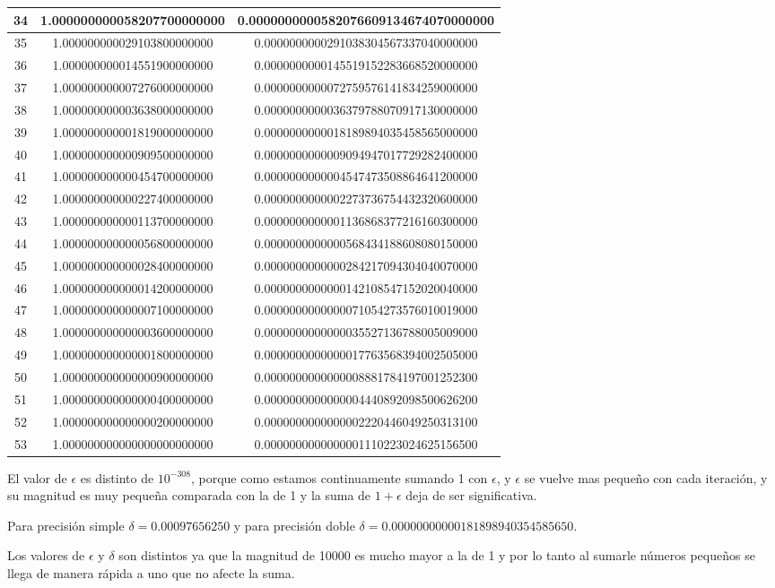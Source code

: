 \documentclass{article}
\begin{document}
\begin{itemize}
\begin{longtable}{|c||c|c|}
		34 & 1.000000000058207700000000 & 0.0000000000582076609134674070000000 \\ \hline 
		35 & 1.000000000029103800000000 & 0.0000000000291038304567337040000000 \\ \hline 
		36 & 1.000000000014551900000000 & 0.0000000000145519152283668520000000 \\ \hline 
		37 & 1.000000000007276000000000 & 0.0000000000072759576141834259000000 \\ \hline 
		38 & 1.000000000003638000000000 & 0.0000000000036379788070917130000000 \\ \hline 
		39 & 1.000000000001819000000000 & 0.0000000000018189894035458565000000 \\ \hline 
		40 & 1.000000000000909500000000 & 0.0000000000009094947017729282400000 \\ \hline 
		41 & 1.000000000000454700000000 & 0.0000000000004547473508864641200000 \\ \hline 
		42 & 1.000000000000227400000000 & 0.0000000000002273736754432320600000 \\ \hline 
		43 & 1.000000000000113700000000 & 0.0000000000001136868377216160300000 \\ \hline 
		44 & 1.000000000000056800000000 & 0.0000000000000568434188608080150000 \\ \hline 
		45 & 1.000000000000028400000000 & 0.0000000000000284217094304040070000 \\ \hline 
		46 & 1.000000000000014200000000 & 0.0000000000000142108547152020040000 \\ \hline 
		47 & 1.000000000000007100000000 & 0.0000000000000071054273576010019000 \\ \hline 
		48 & 1.000000000000003600000000 & 0.0000000000000035527136788005009000 \\ \hline 
		49 & 1.000000000000001800000000 & 0.0000000000000017763568394002505000 \\ \hline 
		50 & 1.000000000000000900000000 & 0.0000000000000008881784197001252300 \\ \hline 
		51 & 1.000000000000000400000000 & 0.0000000000000004440892098500626200 \\ \hline 
		52 & 1.000000000000000200000000 & 0.0000000000000002220446049250313100 \\ \hline 
		53 & 1.000000000000000000000000 & 0.0000000000000001110223024625156500 \\ \hline 
	\end{longtable}
	
	El valor de $\epsilon$ es distinto de $10^{-308}$, porque como estamos continuamente sumando
	1 con $\epsilon$, y $\epsilon$ se vuelve mas pequeño con cada iteración, y su magnitud es muy pequeña
	comparada con la de 1 y la suma de $1 + \epsilon$ deja de ser significativa.
	
	Para precisión simple $\delta = 0.00097656250$ y para precisión doble $\delta = 0.00000000000181898940354585650.$
	
	Los valores de $\epsilon$ y $\delta$ son distintos ya que la magnitud de 10000 es mucho mayor a la de 1 y por lo tanto
	al sumarle números pequeños se llega de manera rápida a uno que no afecte la suma.
\end{itemize}
\end{document}
